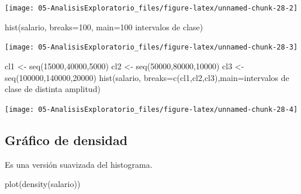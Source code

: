 \documentclass[
]{book}
\newenvironment{Shaded}{\begin{snugshade}}{\end{snugshade}}
\newcommand{\AttributeTok}[1]{\textcolor[rgb]{0.77,0.63,0.00}{#1}}
\newcommand{\DecValTok}[1]{\textcolor[rgb]{0.00,0.00,0.81}{#1}}
\newcommand{\FunctionTok}[1]{\textcolor[rgb]{0.00,0.00,0.00}{#1}}
\newcommand{\NormalTok}[1]{#1}
\newcommand{\OtherTok}[1]{\textcolor[rgb]{0.56,0.35,0.01}{#1}}
\newcommand{\StringTok}[1]{\textcolor[rgb]{0.31,0.60,0.02}{#1}}
\theoremstyle{break}
\begin{document}
\begin{center}\texttt{[image: 05-AnalisisExploratorio\_files/figure-latex/unnamed-chunk-28-2]} \end{center}

\begin{Shaded}
\begin{Highlighting}[]
\FunctionTok{hist}\NormalTok{(salario, }\AttributeTok{breaks=}\DecValTok{100}\NormalTok{, }\AttributeTok{main=}\StringTok{\textquotesingle{}100 intervalos de clase\textquotesingle{}}\NormalTok{)}
\end{Highlighting}
\end{Shaded}

\begin{center}\texttt{[image: 05-AnalisisExploratorio\_files/figure-latex/unnamed-chunk-28-3]} \end{center}

\begin{Shaded}
\begin{Highlighting}[]
\NormalTok{cl1 }\OtherTok{\textless{}{-}} \FunctionTok{seq}\NormalTok{(}\DecValTok{15000}\NormalTok{,}\DecValTok{40000}\NormalTok{,}\DecValTok{5000}\NormalTok{)}
\NormalTok{cl2 }\OtherTok{\textless{}{-}} \FunctionTok{seq}\NormalTok{(}\DecValTok{50000}\NormalTok{,}\DecValTok{80000}\NormalTok{,}\DecValTok{10000}\NormalTok{)}
\NormalTok{cl3 }\OtherTok{\textless{}{-}} \FunctionTok{seq}\NormalTok{(}\DecValTok{100000}\NormalTok{,}\DecValTok{140000}\NormalTok{,}\DecValTok{20000}\NormalTok{)}
\FunctionTok{hist}\NormalTok{(salario, }\AttributeTok{breaks=}\FunctionTok{c}\NormalTok{(cl1,cl2,cl3),}\AttributeTok{main=}\StringTok{\textquotesingle{}intervalos de clase de distinta amplitud\textquotesingle{}}\NormalTok{)}
\end{Highlighting}
\end{Shaded}

\begin{center}\texttt{[image: 05-AnalisisExploratorio\_files/figure-latex/unnamed-chunk-28-4]} \end{center}

\hypertarget{gruxe1fico-de-densidad}{%
\subsection{Gráfico de densidad}\label{gruxe1fico-de-densidad}}

Es una versión suavizada del histograma.

\begin{Shaded}
\begin{Highlighting}[]
\FunctionTok{plot}\NormalTok{(}\FunctionTok{density}\NormalTok{(salario))}
\end{Highlighting}
\end{Shaded}
\end{document}
